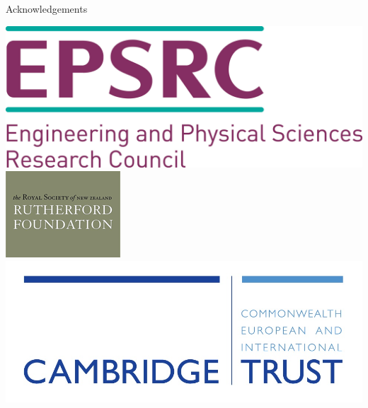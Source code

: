 \documentclass[xcolor=table,aspectratio=169]{beamer}
\numberwithin{equation}{section}
\begin{document}
\begin{frame}{Acknowledgements}
\begin{center}
      \hspace{1em}
      \includegraphics[height = 0.1\paperheight]{figures/fig_EPSRC.jpg}
      \hspace{1em}
      \includegraphics[height = 0.1\paperheight]{figures/fig_Rutherford_foundation.png}
      \hspace{1em}
      \includegraphics[height = 0.1\paperheight]{figures/fig_CCEIT.jpeg}
   \end{center}
   \vspace{2ex}

\end{frame}
\end{document}
